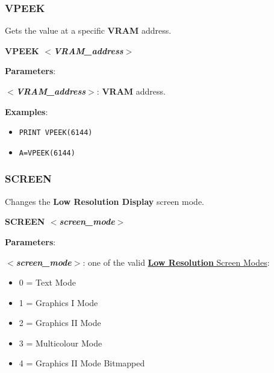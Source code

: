         \subsubsection{{VPEEK}}
        Gets the value at a specific \textbf{VRAM} address.

        \hspace{1.9cm}\textbf{VPEEK \textit{$<$VRAM\_address$>$}}

        \textbf{Parameters}:

        \hspace{1cm}\textbf{\textit{$<$VRAM\_address$>$}}: \textbf{VRAM} address.

        \textbf{Examples}:
        \begin{itemize}
            \item \texttt{PRINT VPEEK(6144)}
            \item \texttt{A=VPEEK(6144)}
        \end{itemize}

        \subsubsection{{SCREEN}}
        Changes the \textbf{Low Resolution Display} screen mode.

        \hspace{1.9cm}\textbf{SCREEN \textit{$<$screen\_mode$>$}}

        \textbf{Parameters}:

        \hspace{1cm}\textbf{\textit{$<$screen\_mode$>$}}: one of the valid
        \hyperref[sec:vdpscrmodes]{\textbf{Low Resolution} Screen Modes}:

        \begin{itemize}
            \item 0 = Text Mode
            \item 1 = Graphics I Mode
            \item 2 = Graphics II Mode
            \item 3 = Multicolour Mode
            \item 4 = Graphics II Mode Bitmapped
        \end{itemize}

